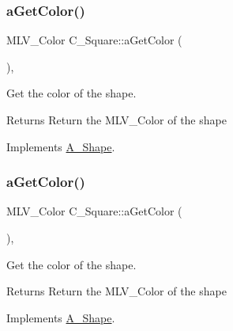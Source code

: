 \subsubsection{\texorpdfstring{a\+Get\+Color()}{aGetColor()}\hspace{0.1cm}{\footnotesize\ttfamily [1/2]}}
{\footnotesize\ttfamily M\+L\+V\+\_\+\+Color C\+\_\+\+Square\+::a\+Get\+Color (\begin{DoxyParamCaption}{ }\end{DoxyParamCaption})\hspace{0.3cm}{\ttfamily [override]}, {\ttfamily [virtual]}}



Get the color of the shape. 

\begin{DoxyReturn}{Returns}
Return the M\+L\+V\+\_\+\+Color of the shape 
\end{DoxyReturn}


Implements \hyperlink{classA__Shape_a1e90c8132d33e4ac84d42f72606193b2}{A\+\_\+\+Shape}.

\mbox{\label{classC__Square_a44b1e58b20cc98edc774a73742fec9a7}} 
\subsubsection{\texorpdfstring{a\+Get\+Color()}{aGetColor()}\hspace{0.1cm}{\footnotesize\ttfamily [2/2]}}
{\footnotesize\ttfamily M\+L\+V\+\_\+\+Color C\+\_\+\+Square\+::a\+Get\+Color (\begin{DoxyParamCaption}{ }\end{DoxyParamCaption})\hspace{0.3cm}{\ttfamily [override]}, {\ttfamily [virtual]}}



Get the color of the shape. 

\begin{DoxyReturn}{Returns}
Return the M\+L\+V\+\_\+\+Color of the shape 
\end{DoxyReturn}


Implements \hyperlink{classA__Shape_a1e90c8132d33e4ac84d42f72606193b2}{A\+\_\+\+Shape}.

\mbox{\label{classC__Square_abd62f2e94839c64b6222667b8eabbfc0}} 
